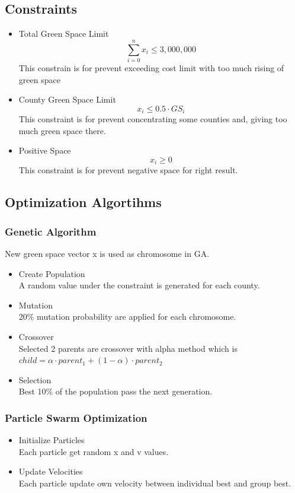 \documentclass[conference]{IEEEtran}
\begin{document}
\subsection{Constraints}
\begin{itemize}
    \item Total Green Space Limit\\
    $$\sum_{i=0}^nx_i \leq 3,000,000$$
    This constrain is for prevent exceeding cost limit with too much rising of green space
    \item County Green Space Limit
    $$x_i\leq 0.5\cdot GS_i$$
    This constraint is for prevent concentrating some counties and, giving too much green space there.
    \item Positive Space
    $$x_i \geq 0$$
    This constraint is for prevent negative space for right result.
\end{itemize}
\subsection{Optimization Algortihms}
\subsubsection{Genetic Algorithm}
New green space vector x is used as chromosome in GA.
\begin{itemize}
    \item Create Population\\
    A random value under the constraint is generated for each county.
    \item Mutation\\
    20\% mutation probability are applied for each chromosome.
    \item Crossover\\
    Selected 2 parents are crossover with alpha method which is $child=\alpha\cdot parent_1+(1-\alpha)\cdot parent_2$
    \item Selection\\
    Best 10\% of the population pass the next generation.
\end{itemize}
\subsubsection{Particle Swarm Optimization}
\begin{itemize}
    \item Initialize Particles\\
    Each particle get random x and v values.
    \item Update Velocities\\
    Each particle update own velocity between individual best and group best.
\end{itemize}
\end{document}

